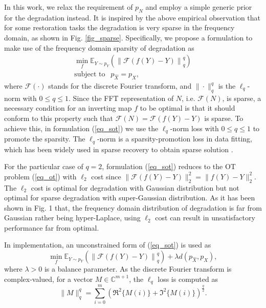 \documentclass[10pt,journal,compsoc]{IEEEtran}
\begin{document}
In this work, we relax the requirement of $p_N$ and employ a simple
generic prior for the degradation instead. It is inspired by the above empirical
observation that for some restoration tasks the degradation is very sparse
in the frequency domain, as shown in Fig. \ref{fig_sparse}. Specifically, we propose
a formulation to make use of the frequency domain sparsity of degradation as
\begin{equation}
\begin{gathered}
  \mathop {\min }\limits_f {\mathbb{E}_{Y \sim {p_Y}}}\left(\left\|\mathcal{F}(f(Y)-Y)\right\|^q_q\right) \\
  {\text{subject \ to \ }}~~{p_{\hat X}} = {p_X},
\end{gathered}
\label{eq_sot}
\end{equation}
where $\mathcal{F}(\cdot)$ stands for the discrete Fourier transform,
and $\|\cdot\|^q_q$ is the $\ell_q$-norm with $0\leq q\leq 1$.
Since the FFT representation of $N$, i.e. $\mathcal{F}(N)$, is sparse,
a necessary condition for an inverting map $f$ to be optimal is that
it should conform to this property such that $\mathcal{F}(N)=\mathcal{F}(f(Y)-Y)$ is sparse.
To achieve this, in formulation (\ref{eq_sot}) we use the $\ell_q$-norm
loss with $0\leq q\leq 1$ to promote the sparsity. The $\ell_q$-norm
is a sparsity-promotion loss in data fitting, which has been widely used
in sparse recovery to obtain sparse solution \cite{lq,wen2016robust}.

For the particular case of $q=2$, formulation (\ref{eq_sot}) reduces
to the OT problem (\ref{eq_ot}) with $\ell_2$ cost since
$\|\mathcal{F}(f(Y)-Y)\|^2_2=\|f(Y)-Y\|^2_2$.
The $\ell_2$ cost is optimal for degradation with Gaussian distribution
but not optimal for sparse degradation with super-Gaussian distribution.
As it has been shown in Fig. 1 that, the frequency domain distribution
of degradation is far from Gaussian rather being hyper-Laplace, using
$\ell_2$ cost can result in unsatisfactory performance far from optimal.

In implementation, an unconstrained form of (\ref{eq_sot}) is used as
\begin{equation}
  \mathop {\min }\limits_f {\mathbb{E}_{Y \sim {p_Y}}}\left(\left\|\mathcal{F}(f(Y)-Y)\right\|^q_q\right) +
  \lambda d(p_{\hat X}, p_X),
\label{eq_sot_unconstrained}
\end{equation}
where $\lambda>0$ is a balance parameter.
As the discrete Fourier transform is complex-valued, for a vector $M\in\mathbb{C}^{m+1}$, the $\ell_q$ loss is computed as
\begin{equation}
\|M\|_q^q=\sum_{i=0}^m\left(\Re^2\{M(i)\}+\Im^2\{M(i)\}\right)^{\frac{q}{2}}.
\label{eq_comlex_lq}
\end{equation}
\end{document}
